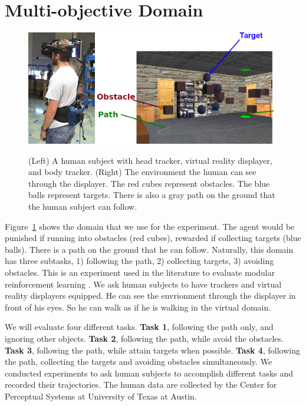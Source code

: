 \documentclass[11pt]{article} %
\begin{document}
\section{Multi-objective Domain}
\label{sec:domain}

\begin{figure}[h!]
\centering
\includegraphics[height=5cm]{human.jpg}
\includegraphics[height=5cm]{env.png}
\caption{(Left) A human subject with head tracker, virtual reality displayer, and
body tracker.  (Right) The environment the human can see through the displayer.
The red cubes represent obstacles. The blue balls represent targets. There is
also a gray path on the ground that the human subject can follow.}
\label{fig:avatar}
\end{figure}

Figure~\ref{fig:avatar} shows the domain that we use for the experiment. 
The agent would be punished if running into obstacles (red cubes), rewarded if
collecting targets (blue balls). There is a path on the ground that he can
follow.
Naturally, this domain has three subtasks, 1) following the path, 2)
collecting targets, 3) avoiding obstacles.
This is an experiment used in the
literature to evaluate modular reinforcement learning
\cite{rothkopf2013modular}.
We ask human subjects to have trackers and virtual reality displayers equipped. He
can see the envrionment through the displayer in front of his eyes. So he can
walk as if he is walking in the virtual domain.

We will evaluate four different tasks. {\bf Task 1}, following the path only, and
ignoring other objects. {\bf Task 2}, following the path, while avoid the obstacles.
{\bf Task 3}, following the path, while attain targets when possible. {\bf Task 4},
following the path, collecting the targets and avoiding obstacles
simultaneously.
We conducted experiments to ask human subjects to accomplish different tasks and
recorded their trajectories. The human data are collected by the Center for
Perceptual Systems at University of Texas at Austin.
\end{document}
